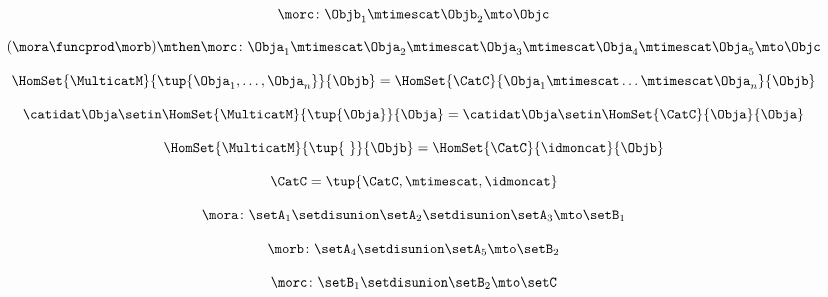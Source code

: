 {\begin{forslides}
        \begin{equation}
            \label{eq:slides_multicategories_15}
            \morc \colon \Objb_1 \mtimescat \Objb_2 \mto \Objc
        \end{equation}

        \begin{equation}
            \label{eq:slides_multicategories_16}
            (\mora \funcprod \morb) \mthen \morc \colon \Obja_1 \mtimescat \Obja_2 \mtimescat \Obja_3 \mtimescat \Obja_4 \mtimescat \Obja_5 \mto \Objc
        \end{equation}

        \begin{equation}
            \label{eq:slides_multicategories_17}
            \HomSet{\MulticatM}{\tup{\Obja_1,\ldots,\Obja_n}}{\Objb}=\HomSet{\CatC}{\Obja_1 \mtimescat \ldots \mtimescat \Obja_n}{\Objb}
        \end{equation}

        \begin{equation}
            \label{eq:slides_multicategories_18}
            \catidat\Obja \setin \HomSet{\MulticatM}{\tup{\Obja}}{\Obja}=\catidat\Obja \setin \HomSet{\CatC}{\Obja}{\Obja}
        \end{equation}

        \begin{equation}
            \label{eq:slides_multicategories_19}
            \HomSet{\MulticatM}{\tup{ \ }}{\Objb} = \HomSet{\CatC}{\idmoncat}{\Objb}
        \end{equation}

        \begin{equation}
            \label{eq:slides_multicategories_20}
            \CatC = \tup{\CatC, \mtimescat, \idmoncat}
        \end{equation}

        \begin{equation}
            \label{eq:slides_multicategories_21}
            \mora \colon \setA_1 \setdisunion \setA_2 \setdisunion \setA_3 \mto \setB_1
        \end{equation}

        \begin{equation}
            \label{eq:slides_multicategories_22}
            \morb \colon \setA_4 \setdisunion \setA_5 \mto \setB_2
        \end{equation}

        \begin{equation}
            \label{eq:slides_multicategories_23}
            \morc \colon \setB_1 \setdisunion \setB_2 \mto \setC
        \end{equation}


\end{forslides}}
